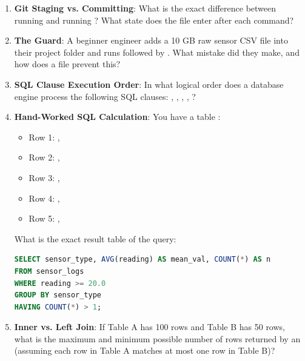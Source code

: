 \begin{enumerate}
    \item \textbf{Git Staging vs. Committing}: What is the exact difference between running  and running ? What state does the file enter after each command?

    \item \textbf{The  Guard}: A beginner engineer adds a 10 GB raw sensor CSV file into their project folder and runs  followed by . What mistake did they make, and how does a  file prevent this?

    \item \textbf{SQL Clause Execution Order}: In what logical order does a database engine process the following SQL clauses: , , , , ?

    \item \textbf{Hand-Worked SQL Calculation}: You have a table :
    \begin{itemize}
        \item Row 1: , 
        \item Row 2: , 
        \item Row 3: , 
        \item Row 4: , 
        \item Row 5: , 
    \end{itemize}
    What is the exact result table of the query:
\begin{lstlisting}[language=SQL]
SELECT sensor_type, AVG(reading) AS mean_val, COUNT(*) AS n
FROM sensor_logs
WHERE reading >= 20.0
GROUP BY sensor_type
HAVING COUNT(*) > 1;
\end{lstlisting}

    \item \textbf{Inner vs. Left Join}: If Table A has 100 rows and Table B has 50 rows, what is the maximum and minimum possible number of rows returned by an  (assuming each row in Table A matches at most one row in Table B)?
\end{enumerate}

